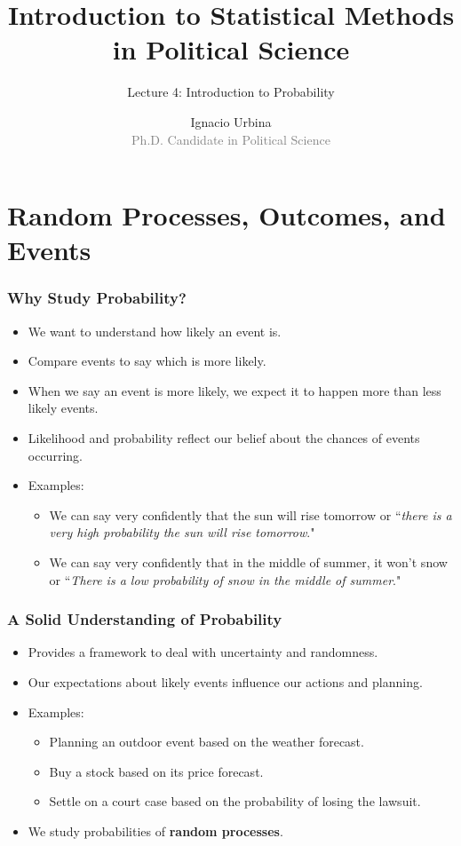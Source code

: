 \documentclass[handout]{beamer} %
\title{Introduction to Statistical Methods in Political Science}
\subtitle{Lecture 4: Introduction to Probability}
\author{Ignacio Urbina \texorpdfstring{\\ \vspace{0.3em}}{ } \scriptsize \textcolor{gray}{Ph.D. Candidate in Political Science}}
\date{}
\begin{document}
\frame{\titlepage}

\section{Random Processes, Outcomes, and Events}

\begin{frame}
    \frametitle{Why Study Probability?}
    \begin{itemize}
        \item We want to understand how likely an event is.
        \pause
        \item Compare events to say which is more likely.
        \pause
        \item When we say an event is more likely, we expect it to happen more than less likely events.
        \pause
        \item Likelihood and probability reflect our belief about the chances of events occurring.
        \pause
        \item Examples:
        \begin{itemize}
            \item We can say very confidently that the sun will rise tomorrow or ``\emph{there is a very high probability the sun will rise tomorrow}." \pause
            \item We can say very confidently that in the middle of summer, it won't snow or ``\emph{There is a low probability of snow in the middle of summer}."
        \end{itemize}
    \end{itemize}
\end{frame}

\begin{frame}
    \frametitle{A Solid Understanding of Probability }
    \begin{itemize}
        \item Provides a framework to deal with uncertainty and randomness.
        \pause
        \item Our expectations about likely events influence our actions and planning.
        \pause
        \item Examples:
        \begin{itemize}
            \item Planning an outdoor event based on the weather forecast. \pause
            \item Buy a stock based on its price forecast. \pause
            \item Settle on a court case based on the probability of losing the lawsuit. \pause
        \end{itemize}
    \item We study probabilities of \textbf{random processes}.
    \end{itemize}
\end{frame}
\end{document}

